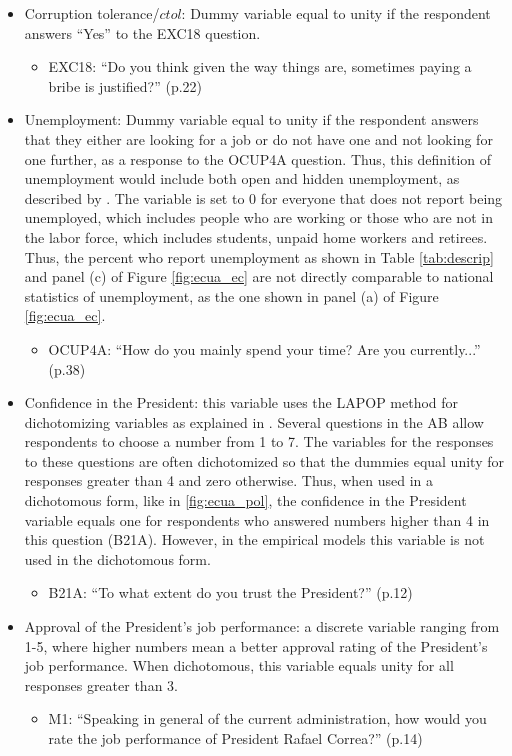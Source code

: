 \documentclass[floatsintext,man]{apa7}\usepackage[]{graphicx}\usepackage[]{color}
\begin{document}
\begin{itemize}
\item Corruption tolerance/$ctol$: Dummy variable equal to unity if the respondent answers \enquote{Yes} to the EXC18 question.
  \begin{itemize}
    \item EXC18: \enquote{Do you think given the way things are, sometimes paying a bribe is justified?} (p.22)
  \end{itemize}
\item Unemployment: Dummy variable equal to unity if the respondent answers that they either are looking for a job or do not have one and not looking for one further, as a response to the OCUP4A question. Thus, this definition of unemployment would include both open and hidden unemployment, as described by \textcite{INEC.2018}. The variable is set to 0 for everyone that does not report being unemployed, which includes people who are working or those who are not in the labor force, which includes students, unpaid home workers and retirees. Thus, the percent who report unemployment as shown in Table \ref{tab:descrip} and panel (c) of Figure \ref{fig:ecua_ec} are not directly comparable to national statistics of unemployment, as the one shown in panel (a) of Figure \ref{fig:ecua_ec}. 
  \begin{itemize}
    \item OCUP4A: \enquote{How do you mainly spend your time? Are you currently...} (p.38)
  \end{itemize}

\item Confidence in the President: this variable uses the LAPOP method for dichotomizing variables as explained in \textcite{Moscoso.2020}. Several questions in the AB allow respondents to choose a number from 1 to 7. The variables for the responses to these questions are often dichotomized so that the dummies equal unity for responses greater than 4 and zero otherwise. Thus, when used in a dichotomous form, like in \ref{fig:ecua_pol}, the confidence in the President variable equals one for respondents who answered numbers higher than 4 in this question (B21A). However, in the empirical models this variable is not used in the dichotomous form. 
  \begin{itemize}
    \item B21A: \enquote{To what extent do you trust the President?} (p.12)
  \end{itemize}
\item Approval of the President's job performance: a discrete variable ranging from 1-5, where higher numbers mean a better approval rating of the President's job performance. When dichotomous, this variable equals unity for all responses greater than 3.
  \begin{itemize}
    \item M1: \enquote{Speaking in general of the current administration, how would you
rate the job performance of President Rafael Correa?} (p.14)
  \end{itemize}


\end{itemize}
\end{document}
